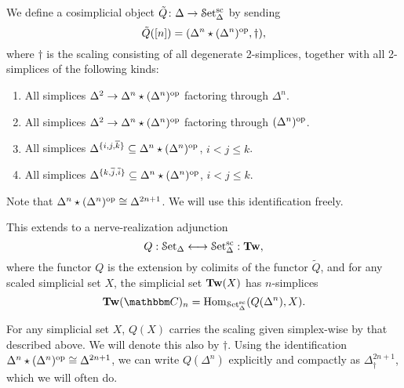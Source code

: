 \documentclass[main.tex]{subfiles}
\begin{document}
\begin{definition}
  We define a cosimplicial object $\tilde{Q}\colon \Delta \to \mathcal{S}\mathrm{et}_{\Delta}^{\mathrm{sc}}$ by sending
  \begin{equation*}
    \tilde{Q}([n]) = (\Delta^{n} \star (\Delta^{n})^{\mathrm{op}}, \dagger),
  \end{equation*}
  where $\dagger$ is the scaling consisting of all degenerate 2-simplices, together with all 2-simplices of the following kinds:
  \begin{enumerate}
    \item All simplices $\Delta^{2} \to \Delta^{n} \star (\Delta^{n})^{\mathrm{op}}$ factoring through $\Delta^{n}$.

    \item All simplices $\Delta^{2} \to \Delta^{n} \star (\Delta^{n})^{\mathrm{op}}$ factoring through $(\Delta^{n})^{\mathrm{op}}$.

    \item All simplices $\Delta^{\{i, j, \overline{k}\}} \subseteq \Delta^{n} \star (\Delta^{n})^{\mathrm{op}}$, $i < j \leq k$.

    \item All simplices $\Delta^{\{k, \overline{j}, \overline{i}\}} \subseteq \Delta^{n} \star (\Delta^{n})^{\mathrm{op}}$, $i < j \leq k$.
  \end{enumerate}
\end{definition}

Note that $\Delta^{n} \star (\Delta^{n})^{\mathrm{op}} \cong \Delta^{2n+1}$. We will use this identification freely.

This extends to a nerve-realization adjunction
\begin{equation*}
  Q : \mathcal{S}\mathrm{et}_{\Delta} \longleftrightarrow \mathcal{S}\mathrm{et}_{\Delta}^{\mathrm{sc}} : \mathbf{Tw},
\end{equation*}
where the functor $Q$ is the extension by colimits of the functor $\tilde{Q}$, and for any scaled simplicial set $X$, the simplicial set $\mathbf{Tw}(X)$ has $n$-simplices
\begin{equation*}
  \Tw(\CC)_{n} = \Hom_{\SSetsc}(Q(\Delta^{n}), X).
\end{equation*}

\begin{notation}
  For any simplicial set $X$, $Q(X)$ carries the scaling given simplex-wise by that described above. We will denote this also by $\dagger$. Using the identification $\Delta^{n} \star (\Delta^{n})^{\mathrm{op}} \cong \Delta^{2n+1}$, we can write $Q(\Delta^{n})$ explicitly and compactly as $\Delta^{2n+1}_{\dagger}$, which we will often do.
\end{notation}
\end{document}
